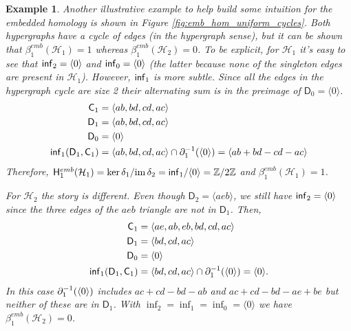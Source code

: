 \documentclass{amsart}
\newtheorem{example}[theorem]{Example}
\newcommand{\Z}{\mathbb{Z}}
\newcommand{\Cgroup}        {\mm{\sf C}}
\newcommand{\Dgroup}	    {\mathsf{D}}
\newcommand{\Hgroup}	     {\mathsf{H}}
\renewcommand{\hom}[2]{\Hgroup_{#2}^{#1}}
\newcommand{\betti}[2]{\beta_{#2}^{#1}}
\renewcommand{\H}{\mathcal{H}}
\newcommand{\myker}{\mm{\mathrm{ker\,}}}
\newcommand{\myim}{\mm{\mathrm{im\,}}}
\newcommand{\bdr}{\mm{\mathrm{\partial}}}
\newcommand {\mm}[1]        {\ifmmode{#1}\else{\mbox{\(#1\)}}\fi}
\newcommand{\infgroup}{\mm{\mathsf{inf}}}
\begin{document}
\begin{example}\label{ex:emb_intuition}
Another illustrative example to help build some intuition for the embedded homology is shown in Figure \ref{fig:emb_hom_uniform_cycles}.
Both hypergraphs have a cycle of edges (in the hypergraph sense), but it can be shown that $\betti{emb}{1}(\H_1) = 1$ whereas $\betti{emb}{1}(\H_2) = 0$.
To be explicit, for $\H_1$ it's easy to see that $\infgroup_2 = \langle 0 \rangle$ and $\infgroup_0 = \langle 0 \rangle$ (the latter because none of the singleton edges are present in $\H_1$). However, $\infgroup_1$ is more subtle. Since all the edges in the hypergraph cycle are size 2 their alternating sum is in the preimage of $\Dgroup_0=\langle 0 \rangle$.
\begin{align*}
    \Cgroup_1 &= \langle ab, bd, cd, ac \rangle \\
    \Dgroup_1 &= \langle ab, bd, cd, ac \rangle \\
    \Dgroup_0 &= \langle 0 \rangle \\
    \infgroup_1(\Dgroup_1, \Cgroup_1) &= \langle  ab, bd, cd, ac \rangle \cap \bdr_1^{-1}(\langle 0 \rangle) = \langle ab + bd - cd - ac \rangle
\end{align*}
Therefore, $\hom{emb}{1}(\H_1) = \myker \delta_1 / \myim \delta_{2} = \infgroup_1 / \langle 0 \rangle = \Z/2\Z$ and $\betti{emb}{1}(\H_1) = 1$. 

For $\H_2$ the story is different. 
Even though $\Dgroup_2 = \langle aeb \rangle$, we still have $\infgroup_2 = \langle 0 \rangle$ since the three edges of the $aeb$ triangle are not in $\Dgroup_1$. Then,
\begin{align*}
    \Cgroup_1 &= \langle ae, ab, eb, bd, cd, ac \rangle \\
    \Dgroup_1 &= \langle bd, cd, ac \rangle \\
    \Dgroup_0 &= \langle 0 \rangle \\
    \infgroup_1(\Dgroup_1, \Cgroup_1) &= \langle  bd, cd, ac \rangle \cap \bdr_1^{-1}(\langle 0 \rangle) = \langle 0 \rangle.
\end{align*}
In this case $\bdr_1^{-1}(\langle 0 \rangle)$ includes $ac+cd-bd-ab$ and $ac+cd-bd-ae+be$ but neither of these are in $\Dgroup_1$. With $\inf_2 = \inf_1 = \inf_0 = \langle 0 \rangle$ we have $\betti{emb}{1}(\H_2) = 0$.
\end{example}
\end{document}
